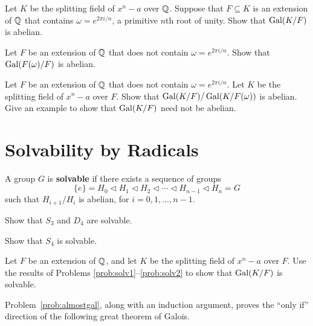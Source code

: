 \begin{problem}\label{prob:solv1}
    Let $K$ be the splitting field of $x^n-a$ over $\mathbb{Q}$. Suppose that $F\subseteq K$ is an extension of $\mathbb{Q}$ that contains $\omega = e^{2\pi i/n}$, a primitive $n$th root of unity. Show that $\operatorname{Gal}(K/F)$ is abelian.
\end{problem}

\begin{problem}
    Let $F$ be an extension of $\mathbb{Q}$ that does not contain $\omega = e^{2\pi i/n}$. Show that $\operatorname{Gal}(F(\omega)/F)$ is abelian.
\end{problem}

\begin{problem}\label{prob:solv2}
    Let $F$ be an extension of $\mathbb{Q}$ that does not contain $\omega = e^{2\pi i/n}$. Let $K$ be the splitting field of $x^n-a$ over $F$. Show that $\operatorname{Gal}(K/F)/\operatorname{Gal}(K/F(\omega))$ is abelian. Give an example to show that $\operatorname{Gal}(K/F)$ need not be abelian.
\end{problem}


\section{Solvability by Radicals}

\begin{definition}
    A group $G$ is \textbf{solvable} if there exists a sequence of groups
    $$\{e\}=H_0\lhd H_1 \lhd H_2\lhd \cdots \lhd H_{n-1}\lhd H_n=G$$
    such that $H_{i+1}/H_{i}$ is abelian,
    for $i=0,1,\ldots,n-1$.
\end{definition}

\begin{problem}
    Show that $S_3$ and $D_4$ are solvable.
\end{problem}

\begin{problem}
    Show that $S_4$ is solvable.
\end{problem}

\begin{problem}\label{prob:almostgal}
    Let $F$ be an extension of $\mathbb{Q}$, and let $K$ be the splitting field of $x^n-a$ over $F$.  Use the results of Problems \ref{prob:solv1}--\ref{prob:solv2} to show that $\operatorname{Gal}(K/F)$ is solvable.
\end{problem}

Problem~\ref{prob:almostgal}, along with an induction argument, proves the ``only if'' direction of the following great theorem of Galois.
\begin{annotation}
\end{annotation}

